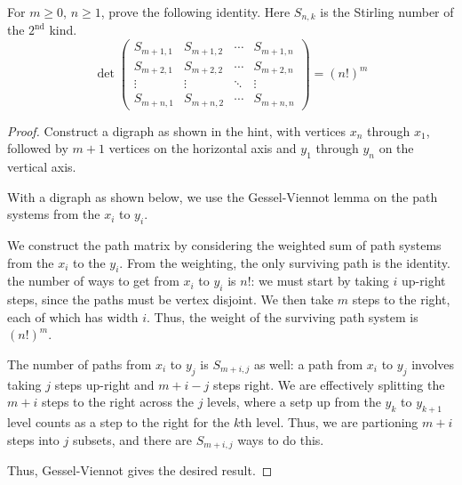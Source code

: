 \documentclass[letterpaper]{article}
\begin{document}
\begin{quest}[\textcolor{red}{Determinant of a matrix of Stirling Numbers}]
    For $m\geq0$, $n\geq 1$, prove the following identity. Here $S_{n,k}$ is the Stirling number of the $2^{\text{nd}}$ kind.
    \[\det\begin{pmatrix}S_{m+1,1}&S_{m+1,2}&\cdots&S_{m+1,n}\\S_{m+2,1}&S_{m+2,2}&\cdots&S_{m+2,n}\\\vdots&\vdots&\ddots&\vdots\\S_{m+n,1}&S_{m+n,2}&\cdots&S_{m+n,n}\end{pmatrix}=(n!)^m\]
\end{quest}
\begin{proof}
    Construct a digraph as shown in the hint, with vertices $x_n$ through $x_1$, followed by $m+1$ vertices on the horizontal axis and $y_1$ through $y_n$ on the vertical axis.

    With a digraph as shown below, we use the Gessel-Viennot lemma on the path systems from the $x_i$ to $y_i$.

    We construct the path matrix by considering the weighted sum of path systems from the $x_i$ to the $y_i$. From the weighting, the only surviving path is the identity. the number of ways to get from $x_i$ to $y_i$ is $n!$: we must start by taking $i$ up-right steps, since the paths must be vertex disjoint. We then take $m$ steps to the right, each of which has width $i$. Thus, the weight of the surviving path system is $(n!)^m$.

    The number of paths from $x_i$ to $y_j$ is $S_{m+i,j}$ as well: a path from $x_i$ to $y_j$ involves taking $j$ steps up-right and $m+i-j$ steps right. We are effectively splitting the $m+i$ steps to the right across the $j$ levels, where a setp up from the $y_k$ to $y_{k+1}$ level counts as a step to the right for the $k$th level. Thus, we are partioning $m+i$ steps into $j$ subsets, and there are $S_{m+i,j}$ ways to do this.

    Thus, Gessel-Viennot gives the desired result.
\end{proof}
\end{document}
